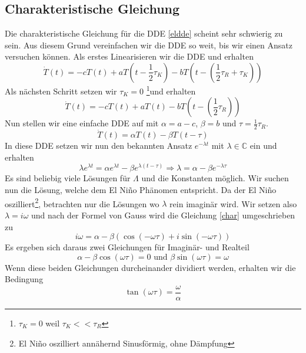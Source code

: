 \subsection{Charakteristische Gleichung}
Die charakteristische Gleichung für die DDE \ref{eldde} scheint sehr schwierig zu sein. 
Aus diesem Grund vereinfachen wir die DDE so weit, bis wir einen Ansatz versuchen können.
Als erstes Linearisieren wir die DDE und erhalten
\begin{equation}
	\dot{T}(t)=-cT(t)+aT(t-\frac{1}{2}\tau_K)-bT(t-(\frac{1}{2}\tau_R+\tau_K))
\end{equation}
Als nächsten Schritt setzen wir $\tau_K=0$ \footnote{$\tau_K=0$ weil $\tau_K << \tau_R$}und erhalten
\begin{equation}
	\dot{T}(t)=-cT(t)+aT(t)-bT(t-(\frac{1}{2}\tau_R))
\end{equation}
Nun stellen wir eine einfache DDE auf mit $\alpha = a-c$, $\beta = b$ und $\tau = \frac{1}{2}\tau_R$.
\begin{equation}
	\dot{T}(t)=\alpha T(t)-\beta T(t-\tau)
\end{equation}
In diese DDE setzen wir nun den bekannten Ansatz $e^{-\lambda t}$ mit $\lambda \in \mathbb{C}$ ein und erhalten
\begin{equation} \label{char}
	\lambda e^{\lambda t} = \alpha e^{\lambda t} - \beta e^{\lambda(t-\tau)} \Longrightarrow \lambda = \alpha-\beta e^{-\lambda \tau}
\end{equation}
Es sind beliebig viele Lösungen für $\Lambda$ und die Konstanten möglich.
Wir suchen nun die Lösung, welche dem El Niño Phänomen entspricht.
Da der El Niño oszilliert\footnote{El Niño oszilliert annähernd Sinusförmig, ohne Dämpfung}, betrachten nur die Lösungen wo $\lambda$ rein imaginär wird. %
Wir setzen also $\lambda = i\omega$ und nach der Formel von Gauss wird die Gleichung \ref{char} umgeschrieben zu 
\begin{equation}
	 i\omega = \alpha-\beta(\cos(-\omega \tau)+i\sin(-\omega \tau))
\end{equation}
Es ergeben sich daraus zwei Gleichungen für Imaginär- und Realteil
\begin{equation} \label{bed1}
  	\alpha-\beta\cos(\omega \tau) = 0 \text{ und } \beta\sin(\omega\tau)=\omega
\end{equation}
Wenn diese beiden Gleichungen durcheinander dividiert werden, erhalten wir die Bedingung
\begin{equation} \label{bed}
	\tan(\omega\tau)=\frac{\omega}{\alpha}
\end{equation}
  	
